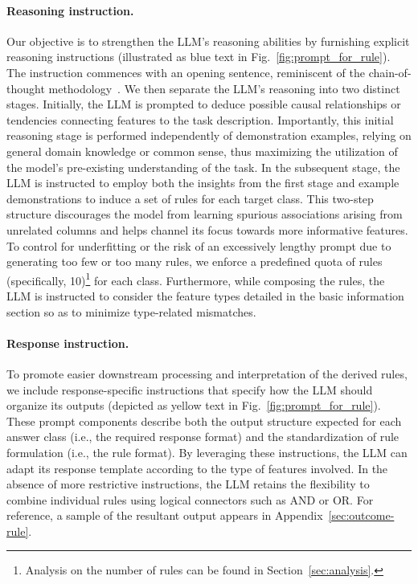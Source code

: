\paragraph{Reasoning instruction.} Our objective is to strengthen the LLM's reasoning abilities by furnishing explicit reasoning instructions (illustrated as blue text in Fig.~\ref{fig:prompt_for_rule}). The instruction commences with an opening sentence, reminiscent of the chain-of-thought methodology~\cite{wei2022chain}. We then separate the LLM's reasoning into two distinct stages. Initially, the LLM is prompted to deduce possible causal relationships or tendencies connecting features to the task description. Importantly, this initial reasoning stage is performed independently of demonstration examples, relying on general domain knowledge or common sense, thus maximizing the utilization of the model’s pre-existing understanding of the task. In the subsequent stage, the LLM is instructed to employ both the insights from the first stage and example demonstrations to induce a set of rules for each target class. This two-step structure discourages the model from learning spurious associations arising from unrelated columns and helps channel its focus towards more informative features. To control for underfitting or the risk of an excessively lengthy prompt due to generating too few or too many rules, we enforce a predefined quota of rules (specifically, 10)\footnote{Analysis on the number of rules can be found in Section~\ref{sec:analysis}.} for each class. Furthermore, while composing the rules, the LLM is instructed to consider the feature types detailed in the basic information section so as to minimize type-related mismatches.

\vspace*{-0.12in}
\paragraph{Response instruction.} To promote easier downstream processing and interpretation of the derived rules, we include response-specific instructions that specify how the LLM should organize its outputs (depicted as yellow text in Fig.~\ref{fig:prompt_for_rule}). These prompt components describe both the output structure expected for each answer class (i.e., the required response format) and the standardization of rule formulation (i.e., the rule format). By leveraging these instructions, the LLM can adapt its response template according to the type of features involved. In the absence of more restrictive instructions, the LLM retains the flexibility to combine individual rules using logical connectors such as AND or OR. For reference, a sample of the resultant output appears in Appendix~\ref{sec:outcome-rule}.

